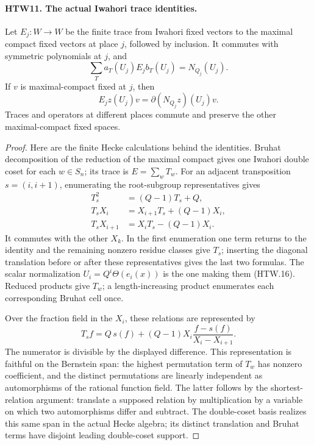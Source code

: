 \documentclass[11pt,a4paper]{article}
\numberwithin{equation}{section}
\theoremstyle{remark}\newtheorem{remark}[theorem]{Remark}
\begin{document}
\paragraph{HTW11. The actual Iwahori trace identities.}
\label{claim:HTW11}
Let \(E_j:W\to W\) be the finite trace from Iwahori
fixed vectors to the maximal compact fixed vectors
at place \(j\), followed by inclusion.  It commutes
with symmetric polynomials at \(j\), and
\[
 \sum_T a_T(U_j)E_jb_T(U_j)=N_{Q_j}(U_j).
 \tag{HTW.14}
\]
If \(v\) is maximal-compact fixed at \(j\), then
\[
 E_j z(U_j)v=\partial(N_{Q_j}z)(U_j)v .
 \tag{HTW.15}
\]
Traces and operators at different places commute and
preserve the other maximal-compact fixed spaces.
\begin{proof}
Here are the finite Hecke calculations behind the
identities.  Bruhat decomposition of the reduction of
the maximal compact gives one Iwahori double coset
for each \(w\in S_n\); its trace is \(E=\sum_wT_w\).
For an adjacent transposition \(s=(i,i+1)\), enumerating
the root-subgroup representatives gives
\[
 \begin{split}
 T_s^2&=(Q-1)T_s+Q,\\
 T_sX_i&=X_{i+1}T_s+(Q-1)X_i,\\
 T_sX_{i+1}&=X_iT_s-(Q-1)X_i .
 \end{split}
 \tag{HTW.16}
\]
It commutes with the other \(X_k\).  In the first
enumeration one term returns to the identity and the
remaining nonzero residue classes give \(T_s\);
inserting the diagonal translation before or after
these representatives gives the last two formulas.
The scalar normalization \(U_i=Q^i\Theta(e_i(x))\)
is the one making them (HTW.16).  Reduced products
give \(T_w\); a length-increasing product enumerates
each corresponding Bruhat cell once.

Over the fraction field in the \(X_i\), these relations
are represented by
\[
 T_sf=Q\,s(f)+(Q-1)X_i
                        \frac{f-s(f)}{X_i-X_{i+1}}.
 \tag{HTW.17}
\]
The numerator is divisible by the displayed difference.
This representation is faithful on the Bernstein span:
the highest permutation term of \(T_w\) has nonzero
coefficient, and the distinct permutations are linearly
independent as automorphisms of the rational function
field.  The latter follows by the shortest-relation
argument: translate a supposed relation by multiplication
by a variable on which two automorphisms differ and
subtract.  The double-coset basis realizes this same
span in the actual Hecke algebra; its distinct
translation and Bruhat terms have disjoint leading
double-coset support.


\end{proof}
\end{document}
